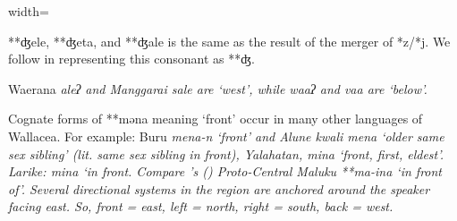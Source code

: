 \begin{table}
\begin{adjustbox}{width=\textwidth}
\begin{threeparttable}
\begin{tablenotes}
{								**ʤele, **ʤeta, and **ʤale is the same as the result of the merger of *z/*j.
								We follow \citet{Elias2018} in representing this consonant as **ʤ.}
			\item[Δ]	{Waerana \it{aleʔ}
								and Manggarai \it{sale} are ‘west’,
								while \it{waaʔ} and \it{vaa} are ‘below’.}
			\item[‖]	{Cognate forms of **məna meaning `front'
								occur in many other languages of Wallacea.
								For example: Buru \it{mena-n} ‘front’ and
								Alune \it{kwali mena} ‘older same sex sibling’
								(lit. same sex sibling in front),
								Yalahatan, \it{mina} ‘front, first, eldest’.
								Larike: \it{mina} ‘in front.
								Compare \citeauthor{Stresemann1927}'s
								(\citeyear[113]{Stresemann1927})
								Proto-Central Maluku **ma-ina ‘in front of’.
								Several directional systems in the
								region are anchored around
								the speaker facing east.
								So, front = east, left = north,
								right = south, back = west.}
		\end{tablenotes}
	\end{threeparttable}
\end{adjustbox}
\end{table}

